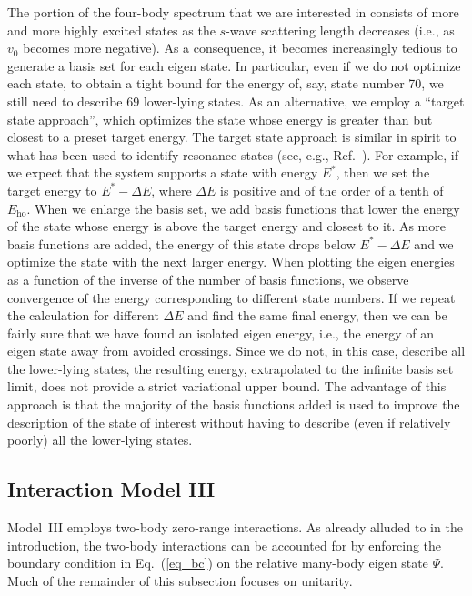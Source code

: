 \documentclass[aps,pra,twocolumn,showpacs,superscriptaddress]{revtex4}
\begin{document}
The portion of the four-body spectrum that we are 
interested in consists of more and more highly excited states as the
$s$-wave scattering length decreases (i.e., as $v_0$ becomes more 
negative). 
As a consequence, it becomes increasingly tedious to 
generate a basis set for each eigen state. In particular, even if we do not
optimize each state, to obtain a tight bound
for the energy of, say, state number 70, we still need to
describe 69 lower-lying states.
As an alternative, we 
employ a ``target  state approach'', which optimizes the state
whose energy is greater than but closest to a preset 
target energy. 
The target state approach is similar in spirit
to what has been used to identify resonance 
states (see, e.g., Ref.~\cite{usukura2002}).
For example, if we expect that the system supports a
state with energy $E^*$, then we set the target energy
to $E^*-\Delta E$, where $\Delta E$ is positive and of the order
of a tenth of $E_{\text{ho}}$. When we enlarge the basis set, we 
add basis functions that lower the energy of the state whose energy
is above the target energy and closest to it. 
As more basis functions are added, the
energy of this state drops below $E^*-\Delta E$ and we optimize the
state with the next larger energy. When plotting the eigen energies
as a function of the inverse of the number of basis functions,
we observe convergence of the energy corresponding to different
state numbers. 
If we repeat the calculation for different $\Delta E$ and find the same
final energy, then we can be fairly sure that we have found an
isolated eigen energy, i.e., the energy of an eigen state
away from avoided crossings.
Since we do not, in this case, describe all the lower-lying states,
the resulting energy, extrapolated  to the infinite basis set limit,
does not provide a strict variational upper bound.
The advantage of this approach is that the majority of the basis
functions added is used to improve the description of the
state of interest without having to describe (even if relatively poorly)
all the lower-lying states. 

\subsection{Interaction Model III}
Model~III employs two-body zero-range interactions.
As already alluded  to in the introduction, the two-body interactions can be
accounted for by
enforcing the boundary condition in Eq.~(\ref{eq_bc})
on the relative many-body eigen state $\Psi$.
Much of the remainder of this subsection focuses on unitarity.
\end{document}
